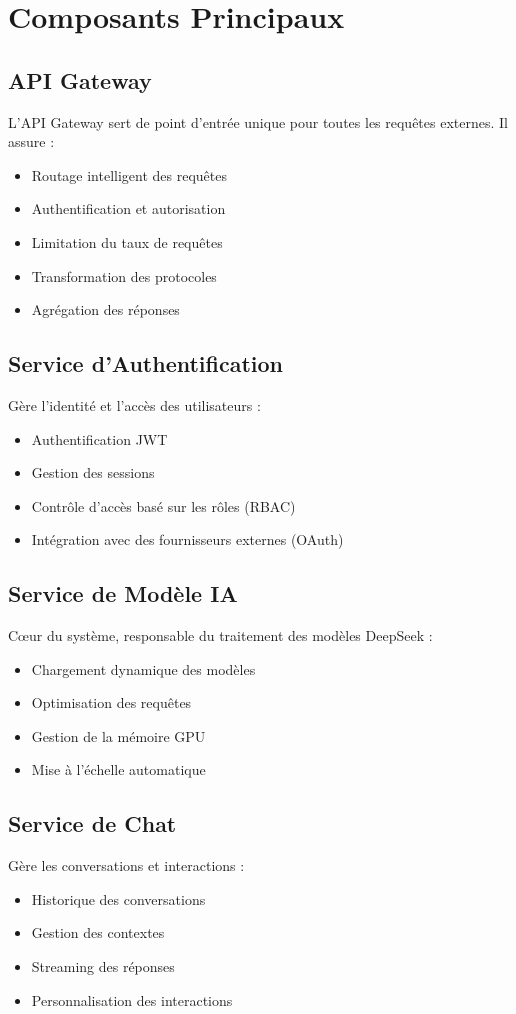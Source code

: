 \documentclass[12pt,a4paper]{article}
\begin{document}
\section{Composants Principaux}

\subsection{API Gateway}
L'API Gateway sert de point d'entrée unique pour toutes les requêtes externes. Il assure :
\begin{itemize}
\item Routage intelligent des requêtes
\item Authentification et autorisation
\item Limitation du taux de requêtes
\item Transformation des protocoles
\item Agrégation des réponses
\end{itemize}

\subsection{Service d'Authentification}
Gère l'identité et l'accès des utilisateurs :
\begin{itemize}
\item Authentification JWT
\item Gestion des sessions
\item Contrôle d'accès basé sur les rôles (RBAC)
\item Intégration avec des fournisseurs externes (OAuth)
\end{itemize}

\subsection{Service de Modèle IA}
Cœur du système, responsable du traitement des modèles DeepSeek :
\begin{itemize}
\item Chargement dynamique des modèles
\item Optimisation des requêtes
\item Gestion de la mémoire GPU
\item Mise à l'échelle automatique
\end{itemize}

\subsection{Service de Chat}
Gère les conversations et interactions :
\begin{itemize}
\item Historique des conversations
\item Gestion des contextes
\item Streaming des réponses
\item Personnalisation des interactions
\end{itemize}
\end{document}
